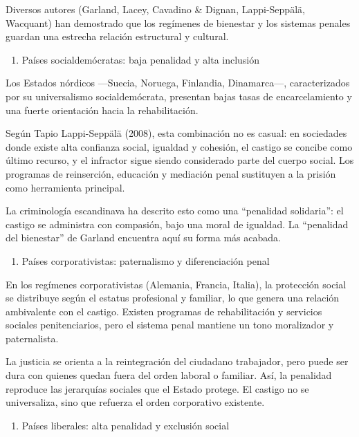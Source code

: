 \documentclass[
  spanish,
  letterpaper,
  DIV=11,
  numbers=noendperiod]{scrreprt}
\providecommand{\tightlist}{%
  \setlength{\itemsep}{0pt}\setlength{\parskip}{0pt}}
\begin{document}
Diversos autores (Garland, Lacey, Cavadino \& Dignan, Lappi-Seppälä,
Wacquant) han demostrado que los regímenes de bienestar y los sistemas
penales guardan una estrecha relación estructural y cultural.

\begin{enumerate}
\def\labelenumi{\alph{enumi})}
\tightlist
\item
  Países socialdemócratas: baja penalidad y alta inclusión
\end{enumerate}

Los Estados nórdicos ---Suecia, Noruega, Finlandia, Dinamarca---,
caracterizados por su universalismo socialdemócrata, presentan bajas
tasas de encarcelamiento y una fuerte orientación hacia la
rehabilitación.

Según Tapio Lappi-Seppälä (2008), esta combinación no es casual: en
sociedades donde existe alta confianza social, igualdad y cohesión, el
castigo se concibe como último recurso, y el infractor sigue siendo
considerado parte del cuerpo social. Los programas de reinserción,
educación y mediación penal sustituyen a la prisión como herramienta
principal.

La criminología escandinava ha descrito esto como una ``penalidad
solidaria'': el castigo se administra con compasión, bajo una moral de
igualdad. La ``penalidad del bienestar'' de Garland encuentra aquí su
forma más acabada.

\begin{enumerate}
\def\labelenumi{\alph{enumi})}
\setcounter{enumi}{1}
\tightlist
\item
  Países corporativistas: paternalismo y diferenciación penal
\end{enumerate}

En los regímenes corporativistas (Alemania, Francia, Italia), la
protección social se distribuye según el estatus profesional y familiar,
lo que genera una relación ambivalente con el castigo. Existen programas
de rehabilitación y servicios sociales penitenciarios, pero el sistema
penal mantiene un tono moralizador y paternalista.

La justicia se orienta a la reintegración del ciudadano trabajador, pero
puede ser dura con quienes quedan fuera del orden laboral o familiar.
Así, la penalidad reproduce las jerarquías sociales que el Estado
protege. El castigo no se universaliza, sino que refuerza el orden
corporativo existente.

\begin{enumerate}
\def\labelenumi{\alph{enumi})}
\setcounter{enumi}{2}
\tightlist
\item
  Países liberales: alta penalidad y exclusión social
\end{enumerate}
\end{document}
